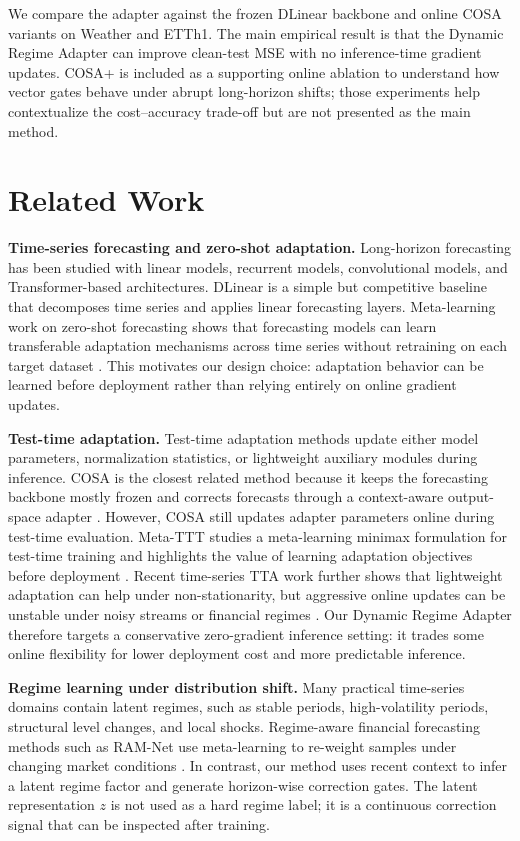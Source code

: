 \documentclass[10pt]{article}
\begin{document}
We compare the adapter against the frozen DLinear backbone and online COSA variants on Weather and ETTh1. The main empirical result is that the Dynamic Regime Adapter can improve clean-test MSE with no inference-time gradient updates. COSA+ is included as a supporting online ablation to understand how vector gates behave under abrupt long-horizon shifts; those experiments help contextualize the cost--accuracy trade-off but are not presented as the main method.

\section{Related Work}
\textbf{Time-series forecasting and zero-shot adaptation.} Long-horizon forecasting has been studied with linear models, recurrent models, convolutional models, and Transformer-based architectures. DLinear \cite{zeng2023dlinear} is a simple but competitive baseline that decomposes time series and applies linear forecasting layers. Meta-learning work on zero-shot forecasting shows that forecasting models can learn transferable adaptation mechanisms across time series without retraining on each target dataset \cite{oreshkin2021meta}. This motivates our design choice: adaptation behavior can be learned before deployment rather than relying entirely on online gradient updates.

\textbf{Test-time adaptation.} Test-time adaptation methods update either model parameters, normalization statistics, or lightweight auxiliary modules during inference. COSA is the closest related method because it keeps the forecasting backbone mostly frozen and corrects forecasts through a context-aware output-space adapter \cite{cosa2026}. However, COSA still updates adapter parameters online during test-time evaluation. Meta-TTT studies a meta-learning minimax formulation for test-time training and highlights the value of learning adaptation objectives before deployment \cite{tao2025metattt}. Recent time-series TTA work further shows that lightweight adaptation can help under non-stationarity, but aggressive online updates can be unstable under noisy streams or financial regimes \cite{wu2026tta}. Our Dynamic Regime Adapter therefore targets a conservative zero-gradient inference setting: it trades some online flexibility for lower deployment cost and more predictable inference.

\textbf{Regime learning under distribution shift.} Many practical time-series domains contain latent regimes, such as stable periods, high-volatility periods, structural level changes, and local shocks. Regime-aware financial forecasting methods such as RAM-Net use meta-learning to re-weight samples under changing market conditions \cite{jang2025ramnet}. In contrast, our method uses recent context to infer a latent regime factor and generate horizon-wise correction gates. The latent representation $z$ is not used as a hard regime label; it is a continuous correction signal that can be inspected after training.
\end{document}
